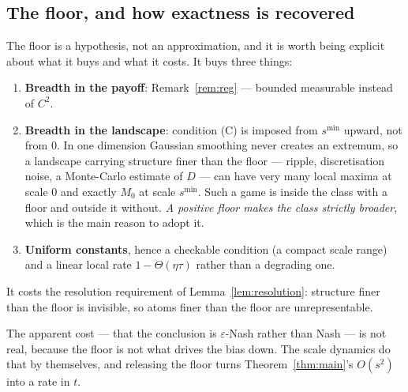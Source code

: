 \documentclass[11pt]{article}
\theoremstyle{definition}
\begin{document}
\subsection{The floor, and how exactness is recovered}\label{sec:floor}

The floor is a hypothesis, not an approximation, and it is worth being explicit
about what it buys and what it costs. It buys three things:

\begin{enumerate}
\item \textbf{Breadth in the payoff}: Remark~\ref{rem:reg} --- bounded measurable
  instead of $C^2$.
\item \textbf{Breadth in the landscape}: condition (C) is imposed from
  $s^{\min}$ upward, not from $0$. In one dimension Gaussian smoothing never
  creates an extremum, so a landscape carrying structure finer than the floor ---
  ripple, discretisation noise, a Monte-Carlo estimate of $D$ --- can have very
  many local maxima at scale $0$ and exactly $M_0$ at scale $s^{\min}$. Such a
  game is inside the class with a floor and outside it without. \emph{A positive
  floor makes the class strictly broader}, which is the main reason to adopt it.
\item \textbf{Uniform constants}, hence a checkable condition (a compact scale
  range) and a linear local rate $1 - \Theta(\eta\tau)$ rather than a degrading
  one.
\end{enumerate}

It costs the resolution requirement of Lemma~\ref{lem:resolution}: structure
finer than the floor is invisible, so atoms finer than the floor are
unrepresentable.

The apparent cost --- that the conclusion is $\varepsilon$-Nash rather than Nash
--- is not real, because the floor is not what drives the bias down. The scale
dynamics do that by themselves, and releasing the floor turns
Theorem~\ref{thm:main}'s $O(s^2)$ into a rate in $t$.
\end{document}

